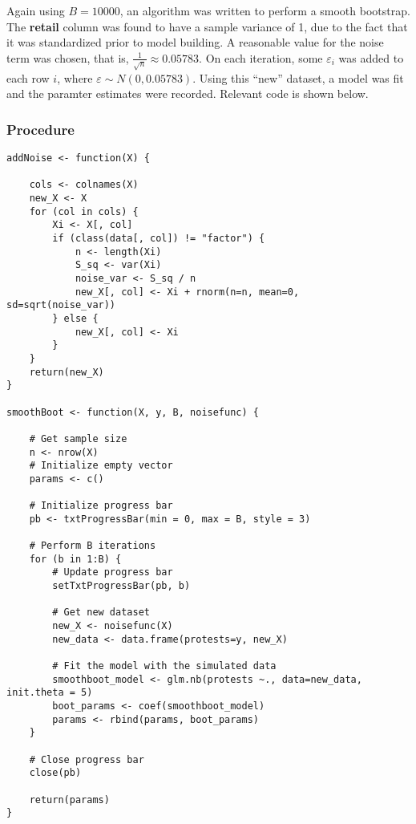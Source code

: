 \documentclass[12pt]{article}
\begin{document}
Again using $B = 10000$, an algorithm was written to perform a smooth bootstrap. The \textbf{retail} column was found to have a sample variance of 1, due to the fact that it was standardized prior to model building. A reasonable value for the noise term was chosen, that is, $\frac{1}{\sqrt{n}} \approx 0.05783$. On each iteration, some $\varepsilon_i$ was added to each row $i$, where $\varepsilon \sim N(0, 0.05783)$. Using this ``new'' dataset, a model was fit and the paramter estimates were recorded. Relevant code is shown below.

\subsubsection*{Procedure}
\begin{lstlisting}
addNoise <- function(X) {

    cols <- colnames(X)
    new_X <- X
    for (col in cols) {
        Xi <- X[, col]
        if (class(data[, col]) != "factor") {
            n <- length(Xi)
            S_sq <- var(Xi)
            noise_var <- S_sq / n
            new_X[, col] <- Xi + rnorm(n=n, mean=0, sd=sqrt(noise_var))
        } else {
            new_X[, col] <- Xi
        }
    }
    return(new_X)
}

smoothBoot <- function(X, y, B, noisefunc) {

    # Get sample size
    n <- nrow(X)
    # Initialize empty vector
    params <- c()
    
    # Initialize progress bar
    pb <- txtProgressBar(min = 0, max = B, style = 3)
    
    # Perform B iterations
    for (b in 1:B) {
        # Update progress bar
        setTxtProgressBar(pb, b)
        
        # Get new dataset
        new_X <- noisefunc(X)
        new_data <- data.frame(protests=y, new_X)
        
        # Fit the model with the simulated data
        smoothboot_model <- glm.nb(protests ~., data=new_data, init.theta = 5)
        boot_params <- coef(smoothboot_model)
        params <- rbind(params, boot_params)
    }
    
    # Close progress bar
    close(pb)
    
    return(params)
}
\end{lstlisting}
\end{document}
